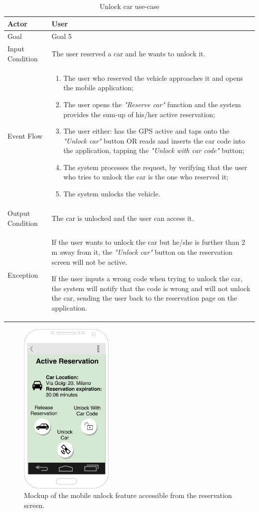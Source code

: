\begin{table}[H]
\begin{center}
\begin{tabular}{p{} | p{}}
\hline
Actor & User\\
\hline
Goal & Goal 5\\
\hline
Input Condition & The user reserved a car and he wants to unlock it.\\
\hline
Event Flow & 
\begin{enumerate}
\item The user who reserved the vehicle approaches it and opens the mobile application;
\item The user opens the \emph{"Reserve car"} function and the system provides the sum-up of his/her active reservation;
\item The user either: has the GPS active and taps onto the \emph{"Unlock car"} button OR reads and inserts the car code into the application, tapping the \emph{"Unlock with car code"} button;
\item The system processes the request, by verifying that the user who tries to unlock the car is the one who reserved it;
\item The system unlocks the vehicle.
\end{enumerate} \\
\hline
Output Condition & The car is unlocked and the user can access it.\\
\hline
Exception & If the user wants to unlock the car but he/she is further than 2 m away from it, the \emph{"Unlock car"} button on the reservation screen will not be active.

If the user inputs a wrong code when trying to unlock the car, the system will notify that the code is wrong and will not unlock the car, sending the user back to the reservation page on the application.\\
\hline
\end{tabular}
\end{center}
\caption{Unlock car use-case}
\label{unlock_car_uc}
\end{table}

\begin{figure}[H]
\begin{center}
		\includegraphics[width=0.4\textwidth]{./specific_requirements/features/diagrams/mobile_unlock.png}
		\caption{Mockup of the mobile unlock feature accessible from the reservation screen.}
		\label{mobile_unlock}
\end{center}
\end{figure}